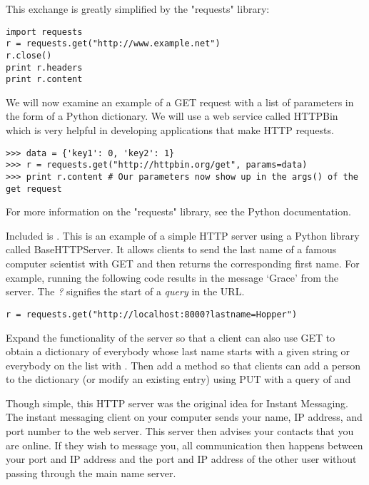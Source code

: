 This exchange is greatly simplified by the "requests" library:
\begin{lstlisting}
import requests
r = requests.get("http://www.example.net")
r.close()
print r.headers
print r.content
\end{lstlisting}

We will now examine an example of a GET request with a list of parameters in the form of a Python dictionary.
We will use a web service called HTTPBin which is very helpful in developing applications that make HTTP requests.
\begin{lstlisting}
>>> data = {'key1': 0, 'key2': 1}
>>> r = requests.get("http://httpbin.org/get", params=data)
>>> print r.content # Our parameters now show up in the args() of the get request
\end{lstlisting}

For more information on the "requests" library, see the Python documentation.
%
\begin{problem}
Included is . This is an example of a simple HTTP server using a Python library called BaseHTTPServer. It allows clients to send the last name of a famous computer scientist with GET and then returns the corresponding first name. For example, running the following code results in the message `Grace' from the server. The \textit{?} signifies the start of a \textit{query} in the URL.

\begin{lstlisting}
r = requests.get("http://localhost:8000?lastname=Hopper")
\end{lstlisting}

Expand the functionality of the server so that a client can also use GET to obtain a dictionary of everybody whose last name starts with a given string or everybody on the list with . Then add a method so that clients can add a person to the dictionary (or modify an existing entry) using PUT with a query of  and 
\end{problem}

Though simple, this HTTP server was the original idea for Instant Messaging. The instant messaging client on your computer sends your name, IP address, and port number to the web server. This server then advises your contacts that you are online. If they wish to message you, all communication then happens between your port and IP address and the port and IP address of the other user without passing through the main name server.

